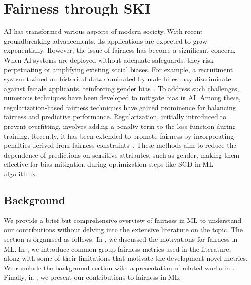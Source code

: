 
\chapter[Fairness through SKI]{Fairness through \gls{SKI}}
\label{ch:fairness-through-ski}
\minitoc

\Gls{AI} has transformed various aspects of modern society.
%
With recent groundbreaking advancements, its applications are expected to grow exponentially.
%
However, the issue of fairness has become a significant concern.
%
When \gls{AI} systems are deployed without adequate safeguards, they risk perpetuating or amplifying existing social biases.
%
For example, a recruitment system trained on historical data dominated by male hires may discriminate against female applicants, reinforcing gender bias~\cite{kochling2020discriminated}.
%
To address such challenges, numerous techniques have been developed to mitigate bias in \gls{AI}.
%
Among these, regularization-based fairness techniques have gained prominence for balancing fairness and predictive performance.
%
Regularization, initially introduced to prevent overfitting, involves adding a penalty term to the loss function during training.
%
Recently, it has been extended to promote fairness by incorporating penalties derived from fairness constraints~\cite{DBLP:conf/icdm/KamishimaAS11}.
%
These methods aim to reduce the dependence of predictions on sensitive attributes, such as gender, making them effective for bias mitigation during optimization steps like \gls{SGD} in \gls{ML} algorithms.
%

\section{Background}\label{sec:fairness-background}
%
We provide a brief but comprehensive overview of fairness in \gls{ML} to understand our contributions without delving into the extensive literature on the topic.
%
The section is organised as follows.
%
In , we discussed the motivations for fairness in \gls{ML}.
%
In , we introduce common group fairness metrics used in the literature, along with some of their limitations that motivate the development novel metrics.
%
We conclude the background section with a presentation of related works in .
%
Finally, in , we present our contributions to fairness in \gls{ML}.


